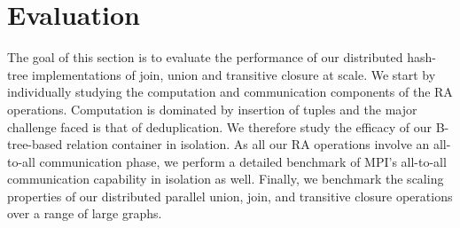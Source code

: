 

\section{Evaluation}
\label{sec:eval}

The goal of this section is to evaluate the performance of our distributed hash-tree implementations of join, union and transitive closure at scale.
We start by individually studying the computation and communication components of the RA operations.
Computation is dominated by insertion of tuples and the major challenge faced is that of deduplication.
We therefore study the efficacy of our B-tree-based relation container in isolation.
As all our RA operations involve an all-to-all communication phase, we perform a detailed benchmark of MPI's all-to-all communication capability in isolation as well.
Finally, we benchmark the scaling properties of our distributed parallel union, join, and transitive closure operations over a range of large graphs.



